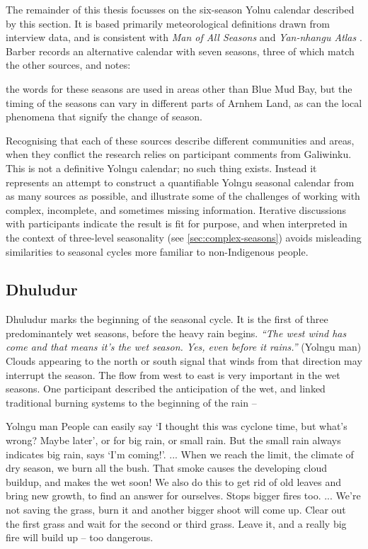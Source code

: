 The remainder of this thesis focusses on the six-season Yolnu calendar
described by this section.  It is based primarily meteorological definitions
drawn from interview data, and is consistent with \textit{Man of All Seasons}
\citep{davis1989} and \textit{Yan-nhangu Atlas} \citep[][p36]{atlas2014}.
Barber records an alternative calendar with
seven seasons, three of which match the other sources, and notes:
\begin{bquote}{\citet[][p.107, App 1 p.18]{barber2005}}
    the words for these seasons are used in areas other than Blue Mud Bay, but
    the timing of the seasons can vary in different parts of Arnhem Land, as can
    the local phenomena that signify the change of season.
\end{bquote}

Recognising that each of these sources describe different communities
and areas, when they conflict the research relies on participant comments
from Galiwinku.  This is not a definitive Yolngu calendar; no such thing
exists.  Instead it represents an attempt to construct a quantifiable Yolngu
seasonal calendar from as many sources as possible, and illustrate some of
the challenges of working with complex, incomplete, and sometimes missing
information.  Iterative discussions with participants indicate the result is
fit for purpose, and when interpreted in the context of three-level seasonality
(see \cref{sec:complex-seasons}) avoids misleading similarities to seasonal
cycles more familiar to non-Indigenous people.


\subsection{Dhuludur}
Dhuludur marks the beginning of the seasonal cycle.  It is the
first of three predominantely wet seasons, before the heavy rain begins.
%
\textsl{``The west wind has come and that means it's the wet season.  Yes, even
before it rains.''} (Yolngu man)  Clouds appearing to the north or south signal that
winds from that direction may interrupt the season.   The flow from west
to east is very important in the wet seasons.
%
One participant described the anticipation of the wet, and linked traditional
burning systems to the beginning of the rain --
\begin{pquote}{Yolngu man}
    People can easily say `I thought this was cyclone time, but what's wrong?
    Maybe later', or for big rain, or small rain.  But the small rain always
    indicates big rain, says `I'm coming!'.
    ...
    When we reach the limit, the climate of dry season, we burn all the bush.
    That smoke causes the developing cloud buildup, and makes the wet soon!
    We also do this to get rid of old leaves and bring new growth,
    to find an answer for ourselves.  Stops bigger fires too.
    ...
    We're not saving the grass, burn it and another bigger shoot will come up.
    Clear out the first grass and wait for the second or third grass.
    Leave it, and a really big fire will build up -- too dangerous.
\end{pquote}

